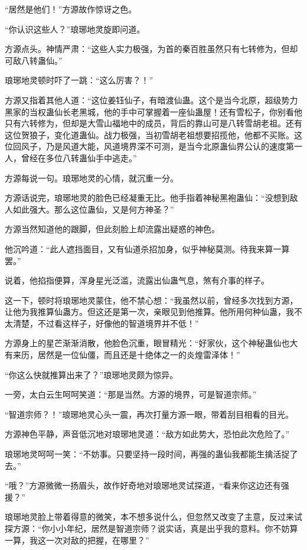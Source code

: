\begin{this_body}
“居然是他们！”方源故作惊讶之色。

“你认识这些人？”琅琊地灵旋即问道。

方源点头。神情严肃：“这些人实力极强，为首的秦百胜虽然只有七转修为，但却可敌八转蛊仙。”

琅琊地灵顿时吓了一跳：“这么厉害？！”

方源又指着其他人道：“这位姜钰仙子，有暗渡仙蛊。这个是当今北原，超级势力黑家的当权蛊仙长老黑城，他的手中可掌握着一座仙蛊屋！还有雪松子，你别看他只有六转修为，但却是大雪山福地中的成员，背后的靠山可是八转雪胡老祖。还有这位贺狼子，变化道蛊仙。战力极强，当初雪胡老祖想要招揽他，他都不买账。这位回风子，乃是风道大能，风道境界深不可测，是当今北原蛊仙界公认的速度第一人，曾经在多位八转蛊仙手中逃走。”

方源每说一句。琅琊地灵的心情，就沉重一分。

方源话说完，琅琊地灵的脸色已经凝重无比。他手指着神秘黑袍蛊仙：“没想到敌人如此强大。那么这位蛊仙，又是何方神圣？”

方源当然知道他的跟脚，但此刻脸上却流露出疑惑的神色。

他沉吟道：“此人遮挡面目，又有仙道杀招加身，似乎神秘莫测。待我来算一算罢。”

说着，他掐指便算，浑身星光泛滥，流露出仙蛊气息，煞有介事的样子。

这一下，顿时将琅琊地灵蒙住，他不禁心想：“我虽然以前，曾经多次找到方源，让他为我推算仙蛊方。但这还是第一次，亲眼见到他推算。他所用何种仙蛊，我不太清楚，不过看这样子，好像他的智道境界并不低！”

方源身上的星芒渐渐消散，他脸色沉重，眼冒精光：“好家伙，这个神秘蛊仙也大有来历，居然是一位仙僵，而且还是十绝体之一的炎煌雷泽体！”

“你这么快就推算出来了？”琅琊地灵颇为惊异。

一旁，太白云生呵呵笑道：“那是当然。方源的境界，可是智道宗师。”

“智道宗师？！”琅琊地灵心头一震，再次打量方源一眼，带着刮目相看的目光。

方源神色平静，声音低沉地对琅琊地灵道：“敌方如此势大，恐怕此次危险了。”

琅琊地灵呵呵一笑：“不妨事。只要坚持一段时间，再强的蛊仙我都能生擒活捉了去。”

“哦？”方源微微一扬眉头，故作好奇地对琅琊地灵试探道，“看来你这边还有强援？”

琅琊地灵脸上带着得意的微笑，本不想多说什么，但忽然又改变了主意，反过来试探方源：“你小小年纪，居然是智道宗师？说实话，真是出乎我的意料。你不妨算一算，我这一次对敌的把握，在哪里？”


\end{this_body}
